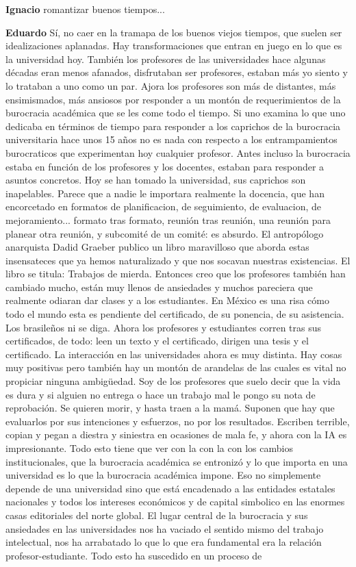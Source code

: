 \documentclass[
  spanish,
  11pt,
  a4paper,
]{scrbook}
\newenvironment{transcripcion}{
    \begin{list}{}{
        \setlength{\leftmargin}{1.5em}  %
        \setlength{\rightmargin}{0em}
        \setlength{\itemsep}{0.2em}     %
        \setlength{\parsep}{0.0em}
        \setlength{\listparindent}{0pt}
    }
}{
    \end{list}
}
\newcommand{\personaje}[1]{\textbf{#1}\quad}
\begin{document}
\begin{transcripcion}
\item \personaje{Ignacio} romantizar buenos tiempos...

\item \personaje{Eduardo} Sí, no caer en la tramapa de los buenos viejos tiempos, que suelen ser idealizaciones aplanadas. Hay transformaciones que entran en juego en lo que es la universidad hoy. También los profesores de las universidades hace algunas décadas eran menos afanados, disfrutaban ser profesores, estaban más yo siento y lo trataban a uno como un par. Ajora los profesores son más de distantes, más ensimismados, más ansiosos por responder a un montón de requerimientos de la burocracia académica que se les come todo el tiempo. Si uno examina lo que uno dedicaba en términos de tiempo para responder a los caprichos de la burocracia universitaria hace unos 15 años no es nada con respecto a los entrampamientos burocraticos que experimentan hoy cualquier profesor. Antes incluso la burocracia estaba en función de los profesores y los docentes, estaban para responder a asuntos concretos. Hoy se han tomado la universidad, sus caprichos son inapelables. Parece que a nadie le importara realmente la docencia, que han encorcetado en formatos de planificacion, de seguimiento, de evaluacion, de mejoramiento... formato tras formato, reunión tras reunión, una reunión para planear otra reunión, y subcomité de un comité: es absurdo. El antropólogo anarquista Dadid Graeber publico un libro maravilloso que aborda estas insensateces que ya hemos naturalizado y que nos socavan nuestras existencias. El libro se titula: Trabajos de mierda. Entonces creo que los profesores también han cambiado mucho, están muy llenos de ansiedades y muchos pareciera que realmente odiaran dar clases y a los estudiantes. En México es una risa cómo todo el mundo esta es pendiente del certificado, de su ponencia, de su asistencia. Los brasileños ni se diga. Ahora los profesores y estudiantes corren tras sus certificados, de todo: leen un texto y el certificado, dirigen una tesis y el certificado. La interacción en las universidades ahora es muy distinta. Hay cosas muy positivas pero también hay un montón de arandelas de las cuales es vital no propiciar ninguna ambigüedad. Soy de los profesores que suelo decir que la vida es dura y si alguien no entrega o hace un trabajo mal le pongo su nota de reprobación. Se quieren morir, y hasta traen a la mamá. Suponen que hay que evaluarlos por sus intenciones y esfuerzos, no por los resultados. Escriben terrible, copian y pegan a diestra y siniestra en ocasiones de mala fe, y ahora con la IA es impresionante. Todo esto tiene que ver con la con la con los cambios institucionales, que la burocracia académica se entronizó y lo que importa en una universidad es lo que la burocracia académica impone. Eso no simplemente depende de una universidad sino que está encadenado a las entidades estatales nacionales y todos los intereses económicos y de capital simbolico en las enormes casas editoriales del norte global. El lugar central de la burocracia y sus ansiedades en las universidades nos ha vaciado el sentido mismo del trabajo intelectual, nos ha arrabatado lo que lo que era fundamental era la relación profesor-estudiante. Todo esto ha suscedido en un proceso de 
\end{transcripcion}
\end{document}
